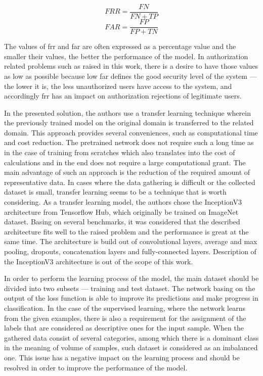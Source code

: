 \begin{equation}
    FRR = \frac{FN}{FN + TP}\label{eq:frr}
\end{equation}
\begin{equation}
    FAR = \frac{FP}{FP + TN}\label{eq:far}
\end{equation}

The values of \gls{frr} and \gls{far} are often expressed as a percentage value and the smaller their values, the better the performance of the model.
In authorization related problems such as raised in this work, there is a desire to have those values as low as possible because low \gls{far} defines the good security level of the system --- the lower it is, the less unauthorized users have access to the system, and accordingly \gls{frr} has an impact on authorization rejections of legitimate users.

In the presented solution, the authors use a transfer learning technique wherein the previously trained model on the original domain is transferred to the related domain.
This approach provides several conveniences, such as computational time and cost reduction.
The pretrained network does not require such a long time as in the case of training from scratches which also translates into the cost of calculations and in the end does not require a large computational grant.
The main advantage of such an approach is the reduction of the required amount of representative data.
In cases where the data gathering is difficult or the collected dataset is small, transfer learning seems to be a technique that is worth considering.
As a transfer learning model, the authors chose the InceptionV3 architecture from Tensorflow Hub, which originally be trained on ImageNet dataset.
Basing on several benchmarks, it was considered that the described architecture fits well to the raised problem and the performance is great at the same time.
The architecture is build out of convolutional layers, average and max pooling, dropouts, concatenation layers and fully-connected layers.
Description of the InceptionV3 architecture is out of the scope of this work.

In order to perform the learning process of the model, the main dataset should be divided into two subsets --- training and test dataset.
The network basing on the output of the loss function is able to improve its predictions and make progress in classification.
In the case of the supervised learning, where the network learns from the given examples, there is also a requirement for the assignment of the labels that are considered as descriptive ones for the input sample.
When the gathered data consist of several categories, among which there is a dominant class in the meaning of volume of samples, such dataset is considered as an imbalanced one.
This issue has a negative impact on the learning process and should be resolved in order to improve the performance of the model.
